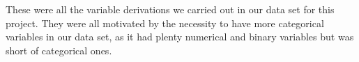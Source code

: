 These were all the variable derivations we carried out in our data set for this
project. They were all motivated by the necessity to have more categorical
variables in our data set, as it had plenty numerical and binary variables but
was short of categorical ones.



